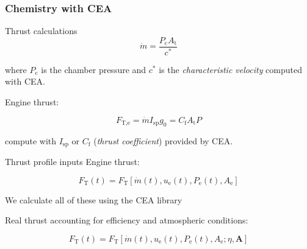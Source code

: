 \documentclass{beamer}
\begin{document}
\subsubsection{Chemistry with CEA}
\begin{frame}{Thrust calculations}
  \begin{equation*}
    \dot{m} = \frac{P_\text{c} A_\text{t}}{c^*}
  \end{equation*}

  where $P_\text{c}$ is the chamber pressure and $c^*$ is the
  \emph{characteristic velocity} computed with CEA.

  \vspace{\baselineskip}

  Engine thrust:

  \begin{equation*}
    F_\text{T,e}
    = \dot{m} I_\text{sp} g_0
    = C_\text{f} A_\text{t} P
  \end{equation*}

  compute with $I_\text{sp}$ or $C_\text{f}$ (\emph{thrust coefficient})
  provided by CEA.
\end{frame}

\begin{frame}[fragile]{Thrust profile inputs}
  Engine thrust:

  \begin{equation}
    F_\text{T} (t)
    = F_\text{T} [\dot m(t), u_\text{e}(t), P_\text{e}(t), A_\text{e}]
  \end{equation}

  We calculate all of these using the CEA library

  \vspace{\baselineskip}

  Real thrust accounting for efficiency and atmospheric conditions:

  \begin{equation}
    F_\text{T} (t)
    = F_\text{T} [
      \dot m(t), u_\text{e}(t), P_\text{e}(t), A_\text{e};
      \eta, \mathbf A
    ]
  \end{equation}
\end{frame}
\end{document}
